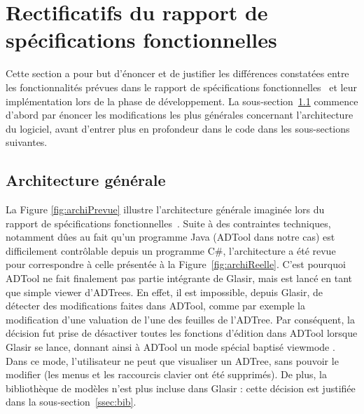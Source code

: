 \section{Rectificatifs du rapport de spécifications fonctionnelles}
\label{sec:rect}

Cette section a pour but d'énoncer et de justifier les différences constatées entre les fonctionnalités prévues dans le rapport de spécifications fonctionnelles~\cite{spec_fonc} et leur implémentation lors de la phase de développement. La {\sc sous-section}~\ref{subsec:archi} commence d'abord par énoncer les modifications les plus générales concernant l'architecture du logiciel, avant d'entrer plus en profondeur dans le code dans les sous-sections suivantes.

\subsection{Architecture générale}
\label{subsec:archi}

La {\sc Figure} \ref{fig:archiPrevue} illustre l'architecture générale imaginée lors du rapport de spécifications fonctionnelles~\cite{spec_fonc}. Suite à des contraintes techniques, notamment dûes au fait qu'un programme Java (ADTool dans notre cas) est difficilement contrôlable depuis un programme C\#, l'architecture a été revue pour correspondre à celle présentée à la {\sc Figure}~\ref{fig:archiReelle}. C'est pourquoi ADTool ne fait finalement pas partie intégrante de Glasir, mais est lancé en tant que simple \og viewer \fg{} d'ADTrees. En effet, il est impossible, depuis Glasir, de détecter des modifications faites dans ADTool, comme par exemple la modification d'une valuation de l'une des feuilles de l'ADTree. Par conséquent, la décision fut prise de désactiver toutes les fonctions d'édition dans ADTool lorsque Glasir se lance, donnant ainsi à ADTool un mode spécial baptisé \og viewmode \fg{}. Dans ce mode, l'utilisateur ne peut que visualiser un ADTree, sans pouvoir le modifier (les menus et les raccourcis clavier ont été supprimés). De plus, la bibliothèque de modèles n'est plus incluse dans Glasir : cette décision est justifiée dans la {\sc sous-section}~\ref{ssec:bib}.

